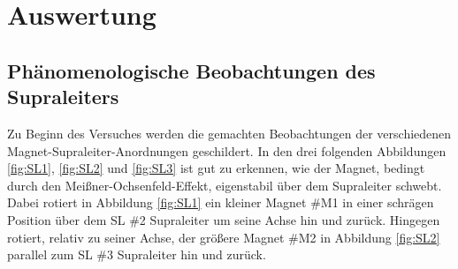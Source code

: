 \section{Auswertung}
\label{sec:Auswertung}

\subsection{Phänomenologische Beobachtungen des Supraleiters}
\label{sec:beo}
Zu Beginn des Versuches werden die gemachten Beobachtungen der verschiedenen
Magnet-Supraleiter-Anordnungen geschildert. In den drei folgenden Abbildungen
\ref{fig:SL1}, \ref{fig:SL2} und \ref{fig:SL3} ist gut zu erkennen,
wie der Magnet, bedingt durch den Meißner-Ochsenfeld-Effekt, eigenstabil über dem
Supraleiter schwebt. Dabei rotiert in Abbildung \ref{fig:SL1} ein kleiner Magnet
\#M1 in einer schrägen Position über dem SL \#2 Supraleiter um seine Achse hin und zurück.
Hingegen rotiert, relativ zu seiner Achse, der größere Magnet \#M2 in Abbildung \ref{fig:SL2}
parallel zum SL \#3 Supraleiter hin und zurück.

